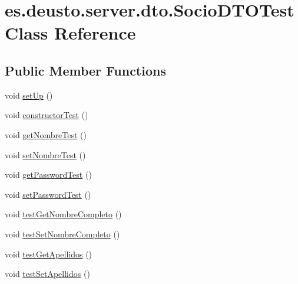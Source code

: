 \hypertarget{classes_1_1deusto_1_1server_1_1dto_1_1_socio_d_t_o_test}{}\section{es.\+deusto.\+server.\+dto.\+Socio\+D\+T\+O\+Test Class Reference}
\label{classes_1_1deusto_1_1server_1_1dto_1_1_socio_d_t_o_test}
\subsection*{Public Member Functions}
\begin{DoxyCompactItemize}
\item 
void \mbox{\hyperlink{classes_1_1deusto_1_1server_1_1dto_1_1_socio_d_t_o_test_aae80032d916030e3f61d798a6f5eef92}{set\+Up}} ()
\item 
void \mbox{\hyperlink{classes_1_1deusto_1_1server_1_1dto_1_1_socio_d_t_o_test_a44946d60fafb859e93ef9779e596df83}{constructor\+Test}} ()
\item 
void \mbox{\hyperlink{classes_1_1deusto_1_1server_1_1dto_1_1_socio_d_t_o_test_ad6fb52cc53e4e5f10b4d961980b69882}{get\+Nombre\+Test}} ()
\item 
void \mbox{\hyperlink{classes_1_1deusto_1_1server_1_1dto_1_1_socio_d_t_o_test_afcecfe8756d6d7c5c7ecee61cba94772}{set\+Nombre\+Test}} ()
\item 
void \mbox{\hyperlink{classes_1_1deusto_1_1server_1_1dto_1_1_socio_d_t_o_test_af517c54019b860346de1f8ce116e247d}{get\+Password\+Test}} ()
\item 
void \mbox{\hyperlink{classes_1_1deusto_1_1server_1_1dto_1_1_socio_d_t_o_test_a62486cb09680e051db408c3d451e644d}{set\+Password\+Test}} ()
\item 
void \mbox{\hyperlink{classes_1_1deusto_1_1server_1_1dto_1_1_socio_d_t_o_test_a672e99d32f5b6cd1e978e18b0f9b1d93}{test\+Get\+Nombre\+Completo}} ()
\item 
void \mbox{\hyperlink{classes_1_1deusto_1_1server_1_1dto_1_1_socio_d_t_o_test_a68e750d4827ac939a1a894c6e8b0549a}{test\+Set\+Nombre\+Completo}} ()
\item 
void \mbox{\hyperlink{classes_1_1deusto_1_1server_1_1dto_1_1_socio_d_t_o_test_a32efad376105afba86cdbf446c0b9ac5}{test\+Get\+Apellidos}} ()
\item 
void \mbox{\hyperlink{classes_1_1deusto_1_1server_1_1dto_1_1_socio_d_t_o_test_a4003e7fed99c772ed53cf60e2633f750}{test\+Set\+Apellidos}} ()
\item 

\end{DoxyCompactItemize}
